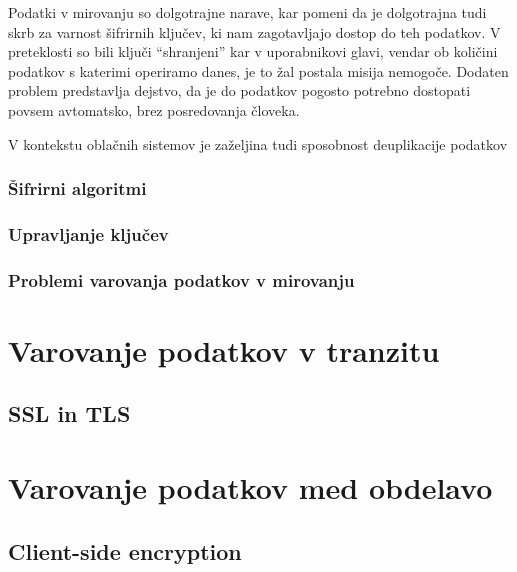 \documentclass[12pt,a4paper,openany]{book}
\begin{document}
Podatki v mirovanju so dolgotrajne narave, kar pomeni da je dolgotrajna tudi skrb za varnost šifrirnih ključev, ki nam zagotavljajo dostop do teh podatkov. V preteklosti so bili ključi ``shranjeni'' kar v uporabnikovi glavi, vendar ob količini podatkov s katerimi operiramo danes, je to žal postala misija nemogoče. Dodaten problem predstavlja dejstvo, da je do podatkov pogosto potrebno dostopati povsem avtomatsko, brez posredovanja človeka.

V kontekstu oblačnih sistemov je zaželjina tudi sposobnost deuplikacije podatkov


\subsubsection{Šifrirni algoritmi}
\label{subs:Šifrirni algoritmi}



\subsubsection{Upravljanje ključev}
\label{subs:Upravljanje ključev}





\subsubsection{Problemi varovanja podatkov v mirovanju}
\label{subs:Problemi varovanja podatkov v mirovanju}




\section{Varovanje podatkov v tranzitu}
\label{sec:Varovanje podatkov v tranzitu}

\subsection{SSL in TLS}
\label{sub:SSL in TLS}


\section{Varovanje podatkov med obdelavo}
\label{sec:Varovanje podatkov med obdelavo}



\subsection{Client-side encryption}
\end{document}

